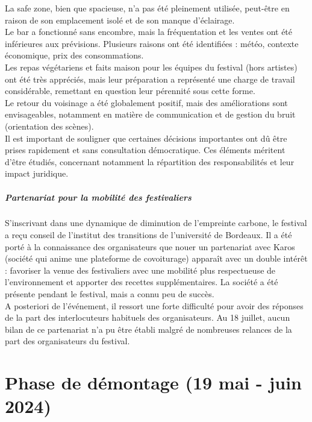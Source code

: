 \documentclass[12pt,a4paper]{report}
\begin{document}
La safe zone, bien que spacieuse, n'a pas été pleinement utilisée, peut-être en raison de son emplacement isolé et de son manque d'éclairage.\\

Le bar a fonctionné sans encombre, mais la fréquentation et les ventes ont été inférieures aux prévisions. Plusieurs raisons ont été identifiées : météo, contexte économique, prix des consommations.\\

Les repas végétariens et faits maison pour les équipes du festival (hors artistes) ont été très appréciés, mais leur préparation a représenté une charge de travail considérable, remettant en question leur pérennité sous cette forme.\\

Le retour du voisinage a été globalement positif, mais des améliorations sont envisageables, notamment en matière de communication et de gestion du bruit (orientation des scènes).\\

Il est important de souligner que certaines décisions importantes ont dû être prises rapidement et sans consultation démocratique. Ces éléments méritent d’être étudiés, concernant notamment la répartition des responsabilités et leur impact juridique.

\subparagraph{Partenariat pour la mobilité des festivaliers}
S'inscrivant dans une dynamique de diminution de l'empreinte carbone, le festival a reçu conseil de l'institut des transitions de l'université de Bordeaux. Il a été porté à la connaissance des organisateurs que nouer un partenariat avec Karos (société qui anime une plateforme de covoiturage) apparaît avec un double intérêt :  favoriser la venue des festivaliers avec une mobilité plus respectueuse de l'environnement et apporter des recettes supplémentaires. La société a été présente pendant le festival, mais a connu peu de succès.\\

A posteriori de l'événement, il ressort une forte difficulté pour avoir des réponses de la part des interlocuteurs habituels des organisateurs. Au 18 juillet, aucun bilan de ce partenariat n'a pu être établi malgré de nombreuses relances de la part des organisateurs du festival.

\section{Phase de démontage (19 mai - juin 2024)}
\end{document}
